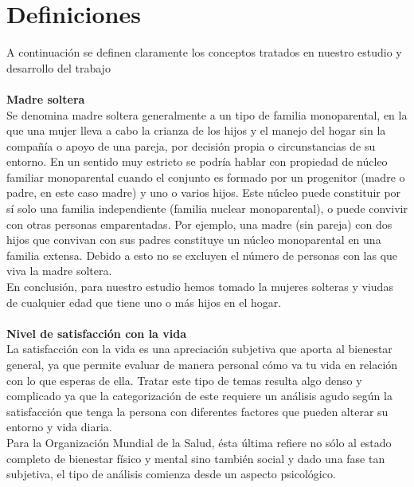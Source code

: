 \documentclass[11pt,twoside]{article}
\begin{document}
\section{Definiciones}
\noindent
A continuación se definen claramente los conceptos tratados en nuestro estudio y desarrollo del trabajo \\
\\
\textbf{Madre soltera} \\
Se denomina madre soltera generalmente a un tipo de familia monoparental, en la que una mujer lleva a cabo la crianza de los hijos y el manejo del hogar sin la compañía o apoyo de una pareja, por decisión propia o circunstancias de su entorno. En un sentido muy estricto se podría hablar con propiedad de núcleo familiar monoparental cuando el conjunto es formado por un progenitor (madre o padre, en este caso madre) y uno o varios hijos. Este núcleo puede constituir por sí solo una familia independiente (familia nuclear monoparental), o puede convivir con otras personas emparentadas. Por ejemplo, una madre (sin pareja) con dos hijos que convivan con sus padres constituye un núcleo monoparental en una familia extensa. Debido a esto no se excluyen el número de personas con las que viva la madre soltera.\\
En conclusión, para nuestro estudio hemos tomado la mujeres solteras y viudas de cualquier edad que tiene uno o más hijos en el hogar.\\
\\
\textbf{Nivel de satisfacción con la vida}\\
La satisfacción con la vida es una apreciación subjetiva que aporta al bienestar general, ya que permite evaluar de manera personal cómo va tu vida en relación con lo que esperas de ella. Tratar este tipo de temas resulta algo denso y complicado ya que la categorización de este requiere un análisis agudo según la satisfacción que tenga la persona con diferentes factores que pueden alterar su entorno y vida diaria.\\
Para la Organización Mundial de la Salud, ésta última refiere no sólo al estado completo de bienestar físico y mental sino también social y dado una fase tan subjetiva, el tipo de análisis comienza desde un aspecto psicológico.




\end{document}
